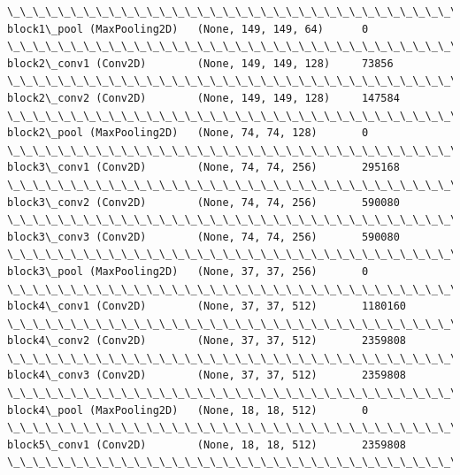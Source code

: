\documentclass[11pt]{article}
\begin{document}
\begin{Verbatim}[commandchars=\\\{\}]
\_\_\_\_\_\_\_\_\_\_\_\_\_\_\_\_\_\_\_\_\_\_\_\_\_\_\_\_\_\_\_\_\_\_\_\_\_\_\_\_\_\_\_\_\_\_\_\_\_\_\_\_\_\_\_\_\_\_\_\_\_\_\_\_\_
block1\_pool (MaxPooling2D)   (None, 149, 149, 64)      0         
\_\_\_\_\_\_\_\_\_\_\_\_\_\_\_\_\_\_\_\_\_\_\_\_\_\_\_\_\_\_\_\_\_\_\_\_\_\_\_\_\_\_\_\_\_\_\_\_\_\_\_\_\_\_\_\_\_\_\_\_\_\_\_\_\_
block2\_conv1 (Conv2D)        (None, 149, 149, 128)     73856     
\_\_\_\_\_\_\_\_\_\_\_\_\_\_\_\_\_\_\_\_\_\_\_\_\_\_\_\_\_\_\_\_\_\_\_\_\_\_\_\_\_\_\_\_\_\_\_\_\_\_\_\_\_\_\_\_\_\_\_\_\_\_\_\_\_
block2\_conv2 (Conv2D)        (None, 149, 149, 128)     147584    
\_\_\_\_\_\_\_\_\_\_\_\_\_\_\_\_\_\_\_\_\_\_\_\_\_\_\_\_\_\_\_\_\_\_\_\_\_\_\_\_\_\_\_\_\_\_\_\_\_\_\_\_\_\_\_\_\_\_\_\_\_\_\_\_\_
block2\_pool (MaxPooling2D)   (None, 74, 74, 128)       0         
\_\_\_\_\_\_\_\_\_\_\_\_\_\_\_\_\_\_\_\_\_\_\_\_\_\_\_\_\_\_\_\_\_\_\_\_\_\_\_\_\_\_\_\_\_\_\_\_\_\_\_\_\_\_\_\_\_\_\_\_\_\_\_\_\_
block3\_conv1 (Conv2D)        (None, 74, 74, 256)       295168    
\_\_\_\_\_\_\_\_\_\_\_\_\_\_\_\_\_\_\_\_\_\_\_\_\_\_\_\_\_\_\_\_\_\_\_\_\_\_\_\_\_\_\_\_\_\_\_\_\_\_\_\_\_\_\_\_\_\_\_\_\_\_\_\_\_
block3\_conv2 (Conv2D)        (None, 74, 74, 256)       590080    
\_\_\_\_\_\_\_\_\_\_\_\_\_\_\_\_\_\_\_\_\_\_\_\_\_\_\_\_\_\_\_\_\_\_\_\_\_\_\_\_\_\_\_\_\_\_\_\_\_\_\_\_\_\_\_\_\_\_\_\_\_\_\_\_\_
block3\_conv3 (Conv2D)        (None, 74, 74, 256)       590080    
\_\_\_\_\_\_\_\_\_\_\_\_\_\_\_\_\_\_\_\_\_\_\_\_\_\_\_\_\_\_\_\_\_\_\_\_\_\_\_\_\_\_\_\_\_\_\_\_\_\_\_\_\_\_\_\_\_\_\_\_\_\_\_\_\_
block3\_pool (MaxPooling2D)   (None, 37, 37, 256)       0         
\_\_\_\_\_\_\_\_\_\_\_\_\_\_\_\_\_\_\_\_\_\_\_\_\_\_\_\_\_\_\_\_\_\_\_\_\_\_\_\_\_\_\_\_\_\_\_\_\_\_\_\_\_\_\_\_\_\_\_\_\_\_\_\_\_
block4\_conv1 (Conv2D)        (None, 37, 37, 512)       1180160   
\_\_\_\_\_\_\_\_\_\_\_\_\_\_\_\_\_\_\_\_\_\_\_\_\_\_\_\_\_\_\_\_\_\_\_\_\_\_\_\_\_\_\_\_\_\_\_\_\_\_\_\_\_\_\_\_\_\_\_\_\_\_\_\_\_
block4\_conv2 (Conv2D)        (None, 37, 37, 512)       2359808   
\_\_\_\_\_\_\_\_\_\_\_\_\_\_\_\_\_\_\_\_\_\_\_\_\_\_\_\_\_\_\_\_\_\_\_\_\_\_\_\_\_\_\_\_\_\_\_\_\_\_\_\_\_\_\_\_\_\_\_\_\_\_\_\_\_
block4\_conv3 (Conv2D)        (None, 37, 37, 512)       2359808   
\_\_\_\_\_\_\_\_\_\_\_\_\_\_\_\_\_\_\_\_\_\_\_\_\_\_\_\_\_\_\_\_\_\_\_\_\_\_\_\_\_\_\_\_\_\_\_\_\_\_\_\_\_\_\_\_\_\_\_\_\_\_\_\_\_
block4\_pool (MaxPooling2D)   (None, 18, 18, 512)       0         
\_\_\_\_\_\_\_\_\_\_\_\_\_\_\_\_\_\_\_\_\_\_\_\_\_\_\_\_\_\_\_\_\_\_\_\_\_\_\_\_\_\_\_\_\_\_\_\_\_\_\_\_\_\_\_\_\_\_\_\_\_\_\_\_\_
block5\_conv1 (Conv2D)        (None, 18, 18, 512)       2359808   
\_\_\_\_\_\_\_\_\_\_\_\_\_\_\_\_\_\_\_\_\_\_\_\_\_\_\_\_\_\_\_\_\_\_\_\_\_\_\_\_\_\_\_\_\_\_\_\_\_\_\_\_\_\_\_\_\_\_\_\_\_\_\_\_\_

\end{Verbatim}
\end{document}
